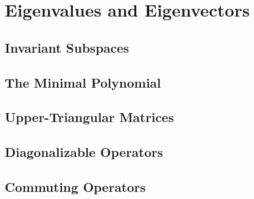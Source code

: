 \chapter{Eigenvalues and Eigenvectors}

\section{Invariant Subspaces}

\section{The Minimal Polynomial}

\section{Upper-Triangular Matrices}

\section{Diagonalizable Operators}

\section{Commuting Operators}

